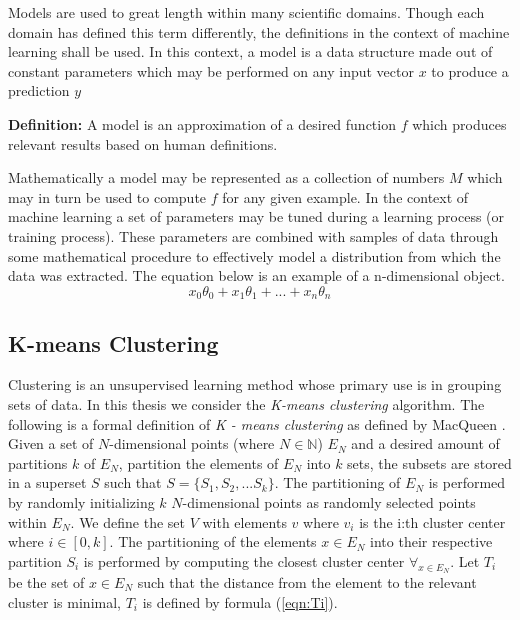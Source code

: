 Models are used to great length within many scientific domains. Though each domain has defined this term differently, the definitions in the context of machine learning shall be used. In this context, a model is a data structure made out of constant parameters which may be performed on any input vector $x$ to produce a prediction $y$

\vspace{5mm}

\textbf{Definition: } A model is an approximation of a desired function $f$ which produces relevant results based on human definitions.  

\vspace{5mm}

Mathematically a model may be represented as a collection of numbers $M$ which may in turn be used to compute $f$ for any given example.
In the context of machine learning a set of parameters may be tuned during a learning process (or training process). These parameters are combined with samples of data through some mathematical procedure to effectively model a distribution from which the data was extracted. The equation below is an example of a n-dimensional object.
$$x_0\theta_0 + x_1\theta_1 + ... + x_n\theta_n$$

\subsection{K-means Clustering}

Clustering is an unsupervised learning method whose primary use is in grouping sets of data. In this thesis we consider the \textit{K-means clustering} algorithm. The following is a formal definition of \textit{K - means clustering} as defined by MacQueen \cite{macqueen}. Given a set of $N$-dimensional points (where $N \in \mathbb{N}$) $E_N$ and a desired amount of partitions $k$ of $E_N$, partition the elements of $E_N$ into $k$ sets, the subsets are stored in a superset $S$ such that $S = \{S_1, S_2, ... S_k\}$. The partitioning of $E_N$ is performed by randomly initializing $k$  $N$-dimensional points as randomly selected points within $E_N$. We define the set $V$ with elements $v$ where $v_i$ is the i:th cluster center where $i \in [0, k]$. The partitioning of the elements $x \in E_N$ into their respective partition $S_i$ is performed by computing the closest cluster center $\forall_{x \in E_N}$. Let $T_i$ be the set of $x \in E_N$ such that the distance from the element to the relevant cluster is minimal, $T_i$ is defined by formula (\ref{eqn:Ti}).

